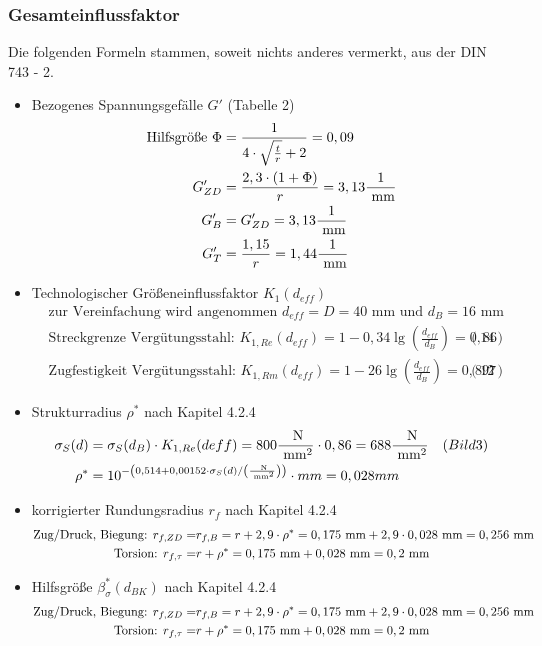 \subsubsection{Gesamteinflussfaktor}
Die folgenden Formeln stammen, soweit nichts anderes vermerkt, aus der DIN 743 - 2.
\begin{itemize}
	\item Bezogenes Spannungsgefälle $G'$ \hfill (Tabelle 2)
	\begin{align*}
	\text{Hilfsgröße } \Phi &= \frac{1}{4 \cdot \sqrt{\frac{t}{r}} +2} = 0,09 \\
	G'_{ZD} &= \frac{2,3 \cdot (1+\Phi)}{r} = 3,13 \frac{1}{\text{ mm}} \\
	G'_{B}&= G'_{ZD}  =3,13 \frac{1}{\text{ mm}} \\
	G'_{T}&= \frac{1,15}{r} = 1,44\frac{1}{\text{ mm}} 
	\end{align*}
	\item Technologischer Größeneinflussfaktor $K_1 (d_{eff})$ 
	\begin{align*}
	&\text{zur Vereinfachung wird angenommen } d_{eff} = D =40 \text{ mm und } d_B = 16 \text{ mm} \\ 
	&\text{Streckgrenze Vergütungsstahl: }K_{1,Re}(d_{eff}) = 1 - 0,34 \lg \left( \frac{d_{eff}}{d_B} \right) = 0,86  &(14) \\
	&\text{Zugfestigkeit Vergütungsstahl: } K_{1,Rm}(d_{eff}) = 1 - 26 \lg \left( \frac{d_{eff}}{d_B} \right) = 0,897  &(12) 
	\end{align*}
	\item Strukturradius $ \rho ^*$ nach Kapitel 4.2.4
	\begin{align*}
	\sigma_S (d) &= \sigma_S (d_B) \cdot K_{1,Re}(deff) = 800 \frac{\text{ N}}{\text{ mm}^2} \cdot 0,86 = 688 \frac{\text{ N}}{\text{ mm}^2} &(Bild 3)\\ 
	\rho ^* &=10 ^{-\left(0,514+0,00152\cdot \sigma_S (d) / \left(\frac{\text{ N}}{\text{ mm}^2} \right) \right)} \cdot mm= 0,028 mm\\
	\end{align*}
	\item korrigierter Rundungsradius $ r_f$ nach Kapitel 4.2.4
	\begin{align*}
	\text{Zug/Druck, Biegung: } r_{f,ZD} =& r_{f,B} = r + 2,9 \cdot \rho ^* = 0,175 \text{ mm} + 2,9 \cdot 0,028 \text{ mm} = 0,256 \text{ mm}\\ 
	\text{Torsion: } r_{f,\tau} =& r +  \rho ^* = 0,175 \text{ mm} + 0,028 \text{ mm} = 0,2\text{ mm}\\ 
	\end{align*}
	\item Hilfsgröße $ \beta _{\sigma} ^* (d_{BK})$ nach Kapitel 4.2.4
	\begin{align*}
	\text{Zug/Druck, Biegung: } r_{f,ZD} =& r_{f,B} = r + 2,9 \cdot \rho ^* = 0,175 \text{ mm} + 2,9 \cdot 0,028 \text{ mm} = 0,256 \text{ mm}\\ 
	\text{Torsion: } r_{f,\tau} =& r +  \rho ^* = 0,175 \text{ mm} + 0,028 \text{ mm} = 0,2\text{ mm}\\ 
	\end{align*}
	

\end{itemize}
